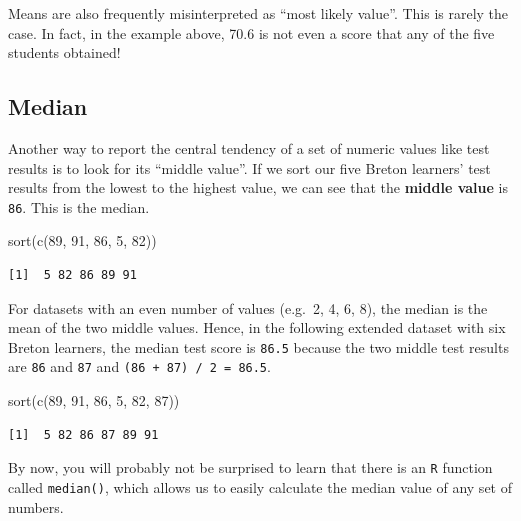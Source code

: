 \documentclass[
  letterpaper,
  DIV=11,
  numbers=noendperiod]{scrreprt}
\newenvironment{Shaded}{\begin{snugshade}}{\end{snugshade}}
\newcommand{\DecValTok}[1]{\textcolor[rgb]{0.68,0.00,0.00}{#1}}
\newcommand{\FunctionTok}[1]{\textcolor[rgb]{0.28,0.35,0.67}{#1}}
\newcommand{\NormalTok}[1]{\textcolor[rgb]{0.00,0.23,0.31}{#1}}
\begin{document}
Means are also frequently misinterpreted as ``most likely value''. This
is rarely the case. In fact, in the example above, 70.6 is not even a
score that any of the five students obtained!

\subsection{Median}\label{sec-Median}

Another way to report the central tendency of a set of numeric values
like test results is to look for its ``middle value''. If we sort our
five Breton learners' test results from the lowest to the highest value,
we can see that the \textbf{middle value} is \texttt{86}. This is the
median.

\begin{Shaded}
\begin{Highlighting}[]
\FunctionTok{sort}\NormalTok{(}\FunctionTok{c}\NormalTok{(}\DecValTok{89}\NormalTok{, }\DecValTok{91}\NormalTok{, }\DecValTok{86}\NormalTok{, }\DecValTok{5}\NormalTok{, }\DecValTok{82}\NormalTok{))}
\end{Highlighting}
\end{Shaded}

\begin{verbatim}
[1]  5 82 86 89 91
\end{verbatim}

For datasets with an even number of values (e.g.~2, 4, 6, 8), the median
is the mean of the two middle values. Hence, in the following extended
dataset with six Breton learners, the median test score is \texttt{86.5}
because the two middle test results are \texttt{86} and \texttt{87} and
\texttt{(86~+~87)~/~2~=~86.5}.

\begin{Shaded}
\begin{Highlighting}[]
\FunctionTok{sort}\NormalTok{(}\FunctionTok{c}\NormalTok{(}\DecValTok{89}\NormalTok{, }\DecValTok{91}\NormalTok{, }\DecValTok{86}\NormalTok{, }\DecValTok{5}\NormalTok{, }\DecValTok{82}\NormalTok{, }\DecValTok{87}\NormalTok{))}
\end{Highlighting}
\end{Shaded}

\begin{verbatim}
[1]  5 82 86 87 89 91
\end{verbatim}

By now, you will probably not be surprised to learn that there is an
\texttt{R} function called \texttt{median()}, which allows us to easily
calculate the median value of any set of numbers.
\end{document}
